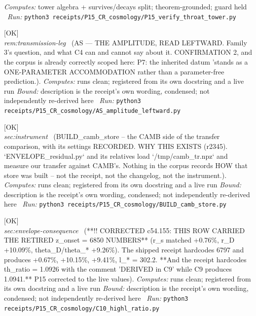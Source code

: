 \begin{description}
\emph{Computes:} tower algebra + survives/decays split; theorem-grounded; guard held
\ \emph{Run:} \texttt{python3 receipts/P15\_CR\_cosmology/P15\_verify\_throat\_tower.py}
\item[\rcptlabel{AS_amplitude_leftward}{P15R41}\textbf{P15R41}\quad\texttt{AS\_amplitude\_leftward}]\hfill\textsf{[OK]}\\
\textit{rem:transmission-leg} \ (AS --- THE AMPLITUDE, READ LEFTWARD. Family 3's question, and what C4 can and cannot say about it. CONFIRMATION 2, and the corpus is already correctly scoped here: P7: the inherited datum 'stands as a ONE-PARAMETER ACCOMMODATION rather than a parameter-free prediction.). 
\emph{Computes:} runs clean; registered from its own docstring and a live run
 \emph{Bound:} description is the receipt's own wording, condensed; not independently re-derived here
\ \emph{Run:} \texttt{python3 receipts/P15\_CR\_cosmology/AS\_amplitude\_leftward.py}
\item[\rcptlabel{BUILD_camb_store}{P15R43}\textbf{P15R43}\quad\texttt{BUILD\_camb\_store}]\hfill\textsf{[OK]}\\
\textit{sec:instrument} \ (BUILD\_camb\_store -- the CAMB side of the transfer comparison, with its settings RECORDED. WHY THIS EXISTS (r2345). `ENVELOPE\_residual.py` and its relatives load `/tmp/camb\_tr.npz` and measure our transfer against CAMB's. Nothing in the corpus records HOW that store was built -- not the receipt, not the changelog, not the instrument.). 
\emph{Computes:} runs clean; registered from its own docstring and a live run
 \emph{Bound:} description is the receipt's own wording, condensed; not independently re-derived here
\ \emph{Run:} \texttt{python3 receipts/P15\_CR\_cosmology/BUILD\_camb\_store.py}
\item[\rcptlabel{C10_highl_ratio}{P15R44}\textbf{P15R44}\quad\texttt{C10\_highl\_ratio}]\hfill\textsf{[OK]}\\
\textit{sec:envelope-consequence} \ (**!! CORRECTED c54.155: THIS ROW CARRIED THE RETIRED z\_onset = 6850 NUMBERS** (r\_s matched +0.76\%, r\_D +10.09\%, theta\_D/theta\_* +9.26\%). The shipped receipt hardcodes 6797 and produces +0.67\%, +10.15\%, +9.41\%, l\_* = 302.2. **And the receipt hardcodes th\_ratio = 1.0926 with the comment 'DERIVED in C9' while C9 produces 1.0941.** P15 corrected to the live values). 
\emph{Computes:} runs clean; registered from its own docstring and a live run
 \emph{Bound:} description is the receipt's own wording, condensed; not independently re-derived here
\ \emph{Run:} \texttt{python3 receipts/P15\_CR\_cosmology/C10\_highl\_ratio.py}

\end{description}
